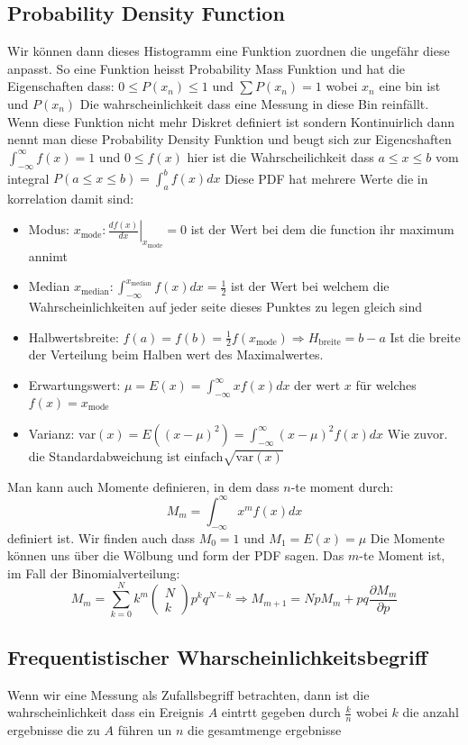 \documentclass{article}
\begin{document}
\subsection*{Probability Density Function}
Wir können dann dieses Histogramm eine Funktion zuordnen die ungefähr diese anpasst. So eine Funktion heisst Probability Mass Funktion und hat die Eigenschaften dass: $0\le P(x_n)\le 1$ und $\sum P(x_n)=1$ wobei $x_n$ eine bin ist und $P(x_n)$ Die wahrscheinlichkeit dass eine Messung in diese Bin reinfällt.
Wenn diese Funktion nicht mehr Diskret definiert ist sondern Kontinuirlich dann nennt man diese Probability Density Funktion und beugt sich zur Eigencshaften $\int_{-\infty}^\infty f(x)=1$ und $0\le f(x)$ hier ist die Wahrscheilichkeit dass $a\le x\le b$ vom integral $P(a\le x\le b)=\int_a^b f(x) dx$
Diese PDF hat mehrere Werte die in korrelation damit sind:
\begin{itemize}
  \item{Modus: $x_\text{mode}:\left.\frac{df(x)}{dx}\right|_{x_\text{mode}}=0$  ist der Wert bei dem die function ihr maximum annimt}
  \item{Median $x_\text{median}:\int_{-\infty}^{x_\text{median}}f(x)dx=\frac{1}{2}$ ist der Wert bei welchem die Wahrscheinlichkeiten auf jeder seite dieses Punktes zu legen gleich sind}
  \item{Halbwertsbreite: $f(a)=f(b)=\frac{1}{2}f(x_\text{mode})\Longrightarrow H_\text{breite}=b-a$ Ist die breite der Verteilung beim Halben wert des Maximalwertes.}
  \item{Erwartungswert: $\mu=E(x)=\int_{-\infty}^\infty xf(x)dx$ der wert $x$ für welches $f(x)=x_\text{mode}$}
  \item{Varianz: var$(x)=E((x-\mu)^2)=\int_{-\infty}^\infty(x-\mu)^2f(x)dx$ Wie zuvor. die Standardabweichung ist einfach$\sqrt{\text{var}(x)}$}
\end{itemize}
Man kann auch Momente definieren, in dem dass $n$-te moment durch:\[M_m=\int_{-\infty}^\infty x^mf(x)dx\] definiert ist. Wir finden auch dass $M_0=1$ und $M_1=E(x)=\mu$
Die Momente können uns über die Wölbung und form der PDF sagen.
\newline Das $m$-te Moment ist, im Fall der Binomialverteilung:\[M_m=\sum_{k=0}^Nk^m\begin{pmatrix}N\\k\end{pmatrix}p^kq^{N-k}\Longrightarrow M_{m+1}=NpM_m+pq\frac{\partial M_m}{\partial p}\]

\subsection*{Frequentistischer Wharscheinlichkeitsbegriff}
Wenn wir eine Messung als Zufallsbegriff betrachten, dann ist die wahrscheinlichkeit dass ein Ereignis $A$ eintrtt gegeben durch $\frac{k}{n}$ wobei $k$ die anzahl ergebnisse die zu $A$ führen un $n$ die gesamtmenge ergebnisse
\end{document}
